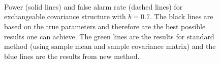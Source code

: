 \begin{figure}[htp]
\centering
{}
\\
\\
\\
\caption{Power (solid lines) and false alarm rate (dashed lines) for exchangeable covariance structure with $b=0.7$. The black lines are based on the true parameters and therefore are the best possible results one can achieve. The green lines are the results for standard method (using sample mean and sample covariance matrix) and the blue lines are the results from new method.        
\label{sup.8}}
\end{figure}




